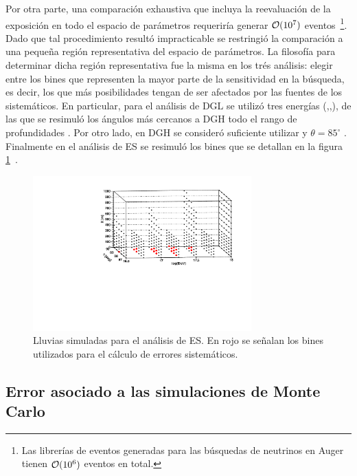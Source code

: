 	Por otra parte, una comparación exhaustiva que incluya la reevaluación de la exposición en todo el espacio de parámetros requeriría generar ${\cal O}(10^7)$ eventos~\footnote{Las librerías de eventos generadas para las búsquedas de neutrinos en Auger tienen ${\cal O}(10^6)$ eventos en total.}. 
	Dado que tal procedimiento result\'o impracticable se restringi\'o la comparación a una pequeña región representativa del espacio de parámetros. 
	La filosofía para determinar dicha región representativa fue la misma en los trés análisis: elegir entre los bines que representen la mayor parte de la sensitividad en la búsqueda, es decir, los que más posibilidades tengan de ser afectados por las fuentes de los sistemáticos.
	En particular, para el análisis de DGL se utilizó tres energías (,,), de las que se resimuló los ángulos más cercanos a DGH todo el rango de profundidades \cite{tesisNavarro}.
	Por otro lado, en DGH se consideró suficiente utilizar  y $\theta=85^\circ$ \cite{tesisJavier}.
	Finalmente en el análisis de ES se resimuló los bines que se detallan en la figura \ref{fig:importantBins_oldWeights}~\cite{tesisYann}.
	\begin{figure}[ht!]
		\begin{center}
			\includegraphics[width=0.75\textwidth]{fig/resultadosAuger/importantBins_oldWeights}
			\caption{Lluvias simuladas para el análisis de ES. En rojo se señalan los bines utilizados para el cálculo de errores sistemáticos.}
			\label{fig:importantBins_oldWeights}
		\end{center}
	\end{figure}
	
	\subsection{Error asociado a las simulaciones de Monte Carlo}
	
